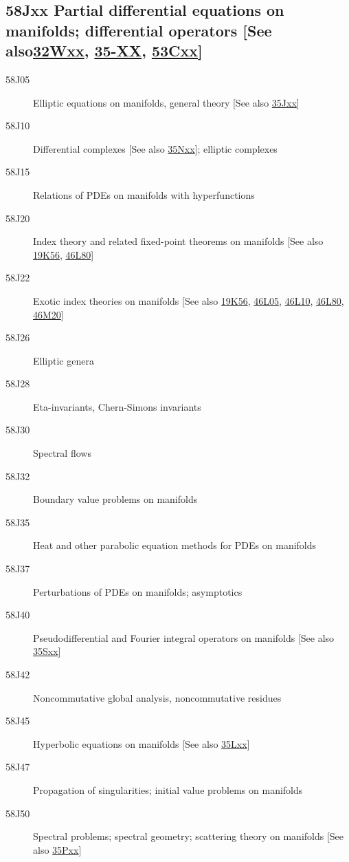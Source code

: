 \subsection*{58Jxx  Partial differential equations on manifolds; differential operators [See also\newline \hyperref[32Wxx]{32Wxx}, \hyperref[35-XX]{35-XX}, \hyperref[53Cxx]{53Cxx}] }\label{58Jxx}
\begin{description}  
\item [58J05]\label{58J05} Elliptic equations on manifolds, general theory [See also \hyperref[35Jxx]{35Jxx}]
\item [58J10]\label{58J10} Differential complexes [See also \hyperref[35Nxx]{35Nxx}]; elliptic complexes
\item [58J15]\label{58J15} Relations of PDEs on manifolds with hyperfunctions
\item [58J20]\label{58J20} Index theory and related fixed-point theorems on manifolds [See also \hyperref[19K56]{19K56}, \hyperref[46L80]{46L80}]
\item [58J22]\label{58J22} Exotic index theories on manifolds [See also \hyperref[19K56]{19K56}, \hyperref[46L05]{46L05}, \hyperref[46L10]{46L10}, \hyperref[46L80]{46L80}, \hyperref[46M20]{46M20}]
\item [58J26]\label{58J26} Elliptic genera
\item [58J28]\label{58J28} Eta-invariants, Chern-Simons invariants
\item [58J30]\label{58J30} Spectral flows
\item [58J32]\label{58J32} Boundary value problems on manifolds
\item [58J35]\label{58J35} Heat and other parabolic equation methods for PDEs on manifolds
\item [58J37]\label{58J37} Perturbations of PDEs on manifolds; asymptotics
\item [58J40]\label{58J40} Pseudodifferential and Fourier integral operators on manifolds [See also \hyperref[35Sxx]{35Sxx}]
\item [58J42]\label{58J42} Noncommutative global analysis, noncommutative residues
\item [58J45]\label{58J45} Hyperbolic equations on manifolds [See also \hyperref[35Lxx]{35Lxx}]
\item [58J47]\label{58J47} Propagation of singularities; initial value problems on manifolds
\item [58J50]\label{58J50} Spectral problems; spectral geometry; scattering theory on manifolds [See also \hyperref[35Pxx]{35Pxx}]

\end{description}
